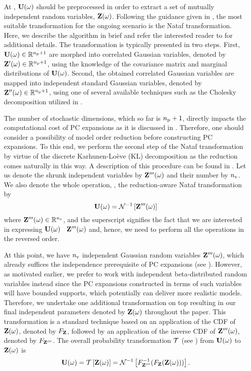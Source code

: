 At , $\mathbf{U}(\omega)$ should be preprocessed in order to extract a set of mutually independent random variables, $\mathbf{Z}(\omega)$.
Following the guidance given in , the most suitable transformation for the ongoing scenario is the Nataf transformation.
Here, we describe the algorithm in brief and refer the interested reader to \cite{li2008} for additional details. The transformation is typically presented in two steps.
First, $\mathbf{U}(\omega) \in \mathbb{R}^{{n_\text{p}} + 1}$ are morphed into correlated Gaussian variables, denoted by $\mathbf{Z}'(\omega) \in \mathbb{R}^{{n_\text{p}} + 1}$, using the knowledge of the covariance matrix and marginal distributions of $\mathbf{U}(\omega)$.
Second, the obtained correlated Gaussian variables are mapped into independent standard Gaussian variables, denoted by $\mathbf{Z}''(\omega) \in \mathbb{R}^{{n_\text{p}} + 1}$, using one of several available techniques such as the Cholesky decomposition \cite{press2007} utilized in \cite{li2008}.

The number of stochastic dimensions, which so far is ${n_\text{p}} + 1$, directly impacts the computational cost of PC expansions as it is discussed in .
Therefore, one should consider a possibility of model order reduction before constructing PC expansions.
To this end, we perform the second step of the Nataf transformation by virtue of the discrete Karhunen-Lo\`{e}ve (KL) decomposition \cite{ghanem1991} as the reduction comes naturally in this way.
A description of this procedure can be found in .
Let us denote the shrunk independent variables by $\mathbf{Z}'''(\omega)$ and their number by ${n_\text{v}}$.
We also denote the whole operation, \ie, the reduction-aware Nataf transformation by
\[
  \mathbf{U}(\omega) = \mathcal{N}^{-1}\left[\mathbf{Z}'''(\omega)\right]
\]
where $\mathbf{Z}'''(\omega) \in \mathbb{R}^{n_\text{v}}$, and the superscript signifies the fact that we are interested in expressing $\mathbf{U}(\omega)$ \via\ $\mathbf{Z}'''(\omega)$ and, hence, we need to perform all the operations in the reversed order.

At this point, we have ${n_\text{v}}$ independent Gaussian random variables $\mathbf{Z}'''(\omega)$, which already suffices the independence prerequisite of PC expansions (see ).
However, as motivated earlier, we prefer to work with independent beta-distributed random variables instead since the PC expansions constructed in terms of such variables will have bounded supports, which potentially can deliver more realistic models.
Therefore, we undertake one additional transformation on top resulting in our final independent parameters denoted by $\mathbf{Z}(\omega)$ throughout the paper.
This transformation is a standard technique \cite{durrett2010} based on an application of the CDF of $\mathbf{Z}(\omega)$, denoted by $F_{\mathbf{Z}}$, followed by an application of the inverse CDF of $\mathbf{Z}'''(\omega)$, denoted by $F_{\mathbf{Z}'''}$.
The overall probability transformation $\oTransform$ (see ) from $\mathbf{U}(\omega)$ to $\mathbf{Z}(\omega)$ is
\[
  \vU(\o) = \oTransform{\vZ(\o)} = \oInvNataf{\fCDF^{-1}_{\vZ'''}(\fCDF_{\vZ}(\vZ(\o)))}.
\]
